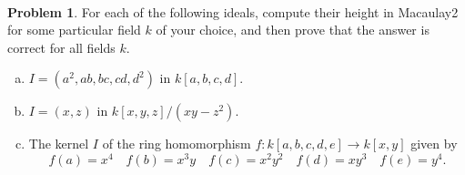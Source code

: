 \documentclass[11pt]{article}
\DeclareMathOperator{\height}{height}
\theoremstyle{definition}
\newtheorem{problem}{Problem}
\begin{document}
%
%
%		
%		
%		

\

\begin{problem}
	For each of the following ideals, compute their height in Macaulay2 for some particular field $k$ of your choice, and then prove that the answer is correct for all fields $k$.

\begin{enumerate}[a)]
\item $I = (a^2,ab,bc,cd,d^2)$ in $k[a,b,c,d]$.
\item $I = (x,z)$ in $k[x,y,z]/(xy-z^2)$.
\item The kernel $I$ of the ring homomorphism $f\!: k[a,b,c,d,e] \to k[x,y]$ given by
$$f(a) = x^4 \quad f(b) = x^3y \quad f(c) = x^2y^2 \quad f(d) = xy^3 \quad f(e) = y^4.$$
\end{enumerate}

\end{problem}
\end{document}
